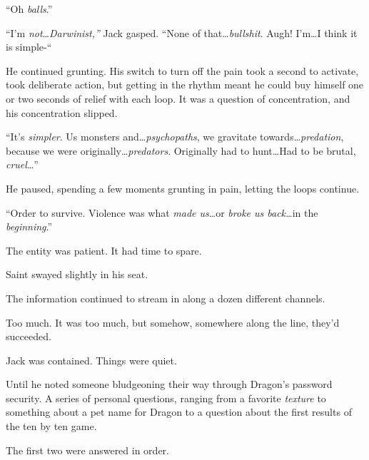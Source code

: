 ``Oh \emph{balls}.''



\blacksquare



``I'm \emph{not}\ldots \emph{Darwinist,'' }Jack gasped.  ``None of that\ldots \emph{bullshit}.  Augh!  I'm\ldots I think it is simple-``



He continued grunting.  His switch to turn off the pain took a second to activate, took deliberate action, but getting in the rhythm meant he could buy himself one or two seconds of relief with each loop.  It was a question of concentration, and his concentration slipped.



``It's \emph{simpler}.  Us monsters and\ldots  \emph{psychopaths}, we gravitate towards\ldots \emph{predation}, because we were originally\ldots \emph{predators}.  Originally had to hunt\ldots  Had to be brutal, \emph{cruel}\ldots''



He paused, spending a few moments grunting in pain, letting the loops continue.



``Order to survive.  Violence was what \emph{made us}\ldots or\emph{ broke us back\ldots }in the\emph{ beginning}.''



The entity was patient.  It had time to spare.



\blacksquare



Saint swayed slightly in his seat.



The information continued to stream in along a dozen different channels.



Too much.  It was too much, but somehow, somewhere along the line, they'd succeeded.



Jack was contained.  Things were quiet.



Until he noted someone bludgeoning their way through Dragon's password security.  A series of personal questions, ranging from a favorite \emph{texture }to something about a pet name for Dragon to a question about the first results of the ten by ten game.



The first two were answered in order.



